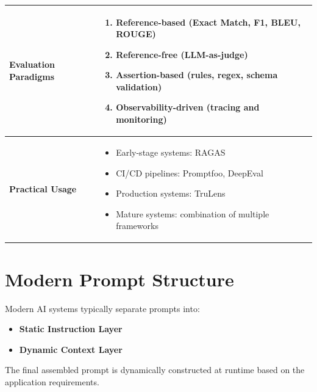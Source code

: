 \documentclass[10pt,a4paper]{article}
\begin{document}
\begin{longtable}{|p{}|p{}|}
\textbf{Evaluation Paradigms} &
\begin{enumerate}
    \item Reference-based (Exact Match, F1, BLEU, ROUGE)
    \item Reference-free (LLM-as-judge)
    \item Assertion-based (rules, regex, schema validation)
    \item Observability-driven (tracing and monitoring)
\end{enumerate}
\\
\hline

\textbf{Practical Usage} &
\begin{itemize}
    \item Early-stage systems: RAGAS
    \item CI/CD pipelines: Promptfoo, DeepEval
    \item Production systems: TruLens
    \item Mature systems: combination of multiple frameworks
\end{itemize}
\\
\hline

\end{longtable}

\newpage 
\section{Modern Prompt Structure}

Modern AI systems typically separate prompts into:
\begin{itemize}
\item \textbf{Static Instruction Layer}
\item \textbf{Dynamic Context Layer}
\end{itemize}

The final assembled prompt is dynamically constructed at runtime
based on the application requirements.

\vspace{0.3cm}
\end{document}

